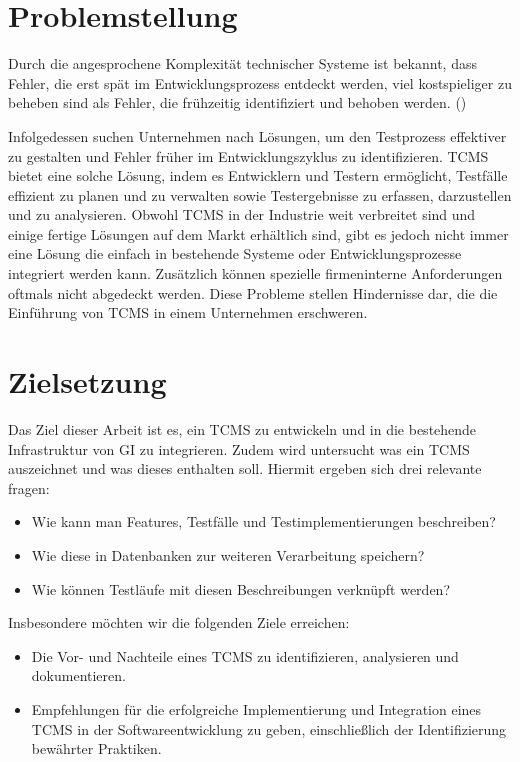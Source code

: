 \documentclass[a4paper, fontsize=11pt, parskip=half, twoside]{scrreprt}
\begin{document}
	\section{Problemstellung}
	Durch die angesprochene Komplexität technischer Systeme ist bekannt, dass Fehler, die erst spät im Entwicklungsprozess entdeckt werden, viel kostspieliger zu beheben sind als Fehler, die frühzeitig identifiziert und behoben werden. (\textcite{westland_cost_2002})
	
	Infolgedessen suchen Unternehmen nach Lösungen, um den Testprozess effektiver zu gestalten und Fehler früher im Entwicklungszyklus zu identifizieren. 
	\ac{TCMS} bietet eine solche Lösung, indem es Entwicklern und Testern ermöglicht, Testfälle effizient zu planen und zu verwalten sowie Testergebnisse zu erfassen, darzustellen und zu analysieren. 
	Obwohl \ac{TCMS} in der Industrie weit verbreitet sind und einige fertige Lösungen auf dem Markt erhältlich sind, gibt es jedoch nicht immer eine Lösung die einfach in bestehende Systeme oder Entwicklungsprozesse integriert werden kann. 
	Zusätzlich können spezielle firmeninterne Anforderungen oftmals nicht abgedeckt werden.
	Diese Probleme stellen Hindernisse dar, die die Einführung von \ac{TCMS} in einem Unternehmen erschweren. 
	
	\section{Zielsetzung}
	Das Ziel dieser Arbeit ist es, ein \ac{TCMS} zu entwickeln und in die bestehende Infrastruktur von \ac{GI} zu integrieren.
	Zudem wird untersucht was ein \ac{TCMS} auszeichnet und was dieses enthalten soll.
	Hiermit ergeben sich drei relevante fragen:
	
	\begin{itemize}
		\item Wie kann man Features, Testfälle und Testimplementierungen beschreiben? 
		\item Wie diese in Datenbanken zur weiteren Verarbeitung speichern? 
		\item Wie können Testläufe mit diesen Beschreibungen verknüpft werden?
	\end{itemize}
	
	Insbesondere möchten wir die folgenden Ziele erreichen:
	
	\begin{itemize}
		\item Die Vor- und Nachteile eines \ac{TCMS} zu identifizieren, analysieren und dokumentieren.
		\item Empfehlungen für die erfolgreiche Implementierung und Integration eines \ac{TCMS} in der Softwareentwicklung zu geben, einschließlich der Identifizierung bewährter Praktiken.
	\end{itemize}
	
\end{document}
